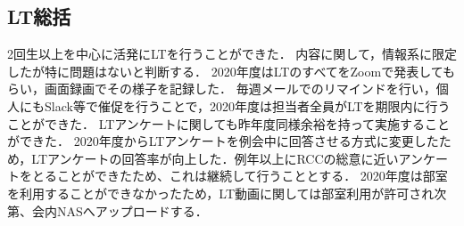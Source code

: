 \subsection*{LT総括}


2回生以上を中心に活発にLTを行うことができた．
内容に関して，情報系に限定したが特に問題はないと判断する．
2020年度はLTのすべてをZoomで発表してもらい，画面録画でその様子を記録した．
毎週メールでのリマインドを行い，個人にもSlack等で催促を行うことで，2020年度は担当者全員がLTを期限内に行うことができた．
LTアンケートに関しても昨年度同様余裕を持って実施することができた．
2020年度からLTアンケートを例会中に回答させる方式に変更したため，LTアンケートの回答率が向上した．例年以上にRCCの総意に近いアンケートをとることができたため、これは継続して行うこととする．
2020年度は部室を利用することができなかったため，LT動画に関しては部室利用が許可され次第、会内NASへアップロードする．
